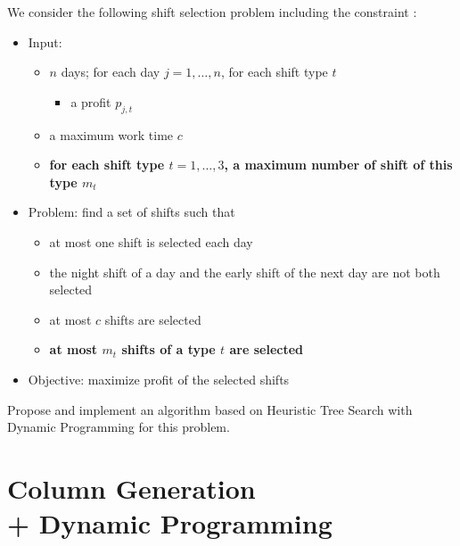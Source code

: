 \documentclass[a4paper,twocolumn]{article}
\begin{document}
We consider the following shift selection problem including the constraint :
\begin{itemize}
  \item Input:
    \begin{itemize}
      \item $n$ days; for each day $j = 1, \dots, n$, for each shift type $t$
        \begin{itemize}
          \item a profit $p_{j, t}$
        \end{itemize}
      \item a maximum work time $c$
      \item \textbf{for each shift type $t = 1, \dots, 3$, a maximum number of shift of this type $m_t$}
    \end{itemize}
  \item Problem: find a set of shifts such that
    \begin{itemize}
      \item at most one shift is selected each day
      \item the night shift of a day and the early shift of the next day are not both selected
      \item at most $c$ shifts are selected
      \item \textbf{at most $m_t$ shifts of a type $t$ are selected}
    \end{itemize}
  \item Objective: maximize profit of the selected shifts
\end{itemize}

Propose and implement an algorithm based on Heuristic Tree Search with Dynamic Programming for this problem.

\section{Column Generation \\ + Dynamic Programming}
\end{document}
